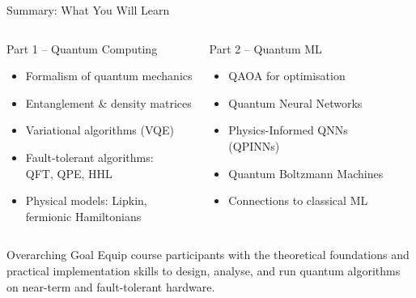 \documentclass[aspectratio=169,12pt]{beamer}
\begin{document}
\begin{frame}{Summary: What You Will Learn}
  \begin{columns}[T]
      \begin{block}{Part 1 -- Quantum Computing}
        \begin{itemize}
          \item Formalism of quantum mechanics
          \item Entanglement \& density matrices
          \item Variational algorithms (VQE)
          \item Fault-tolerant algorithms:\\
                QFT, QPE, HHL
          \item Physical models: Lipkin,\\
                fermionic Hamiltonians
        \end{itemize}
      \end{block}
      \begin{block}{Part 2 -- Quantum ML}
        \begin{itemize}
          \item QAOA for optimisation
          \item Quantum Neural Networks
          \item Physics-Informed QNNs\\
                (QPINNs)
          \item Quantum Boltzmann Machines
          \item Connections to classical ML
        \end{itemize}
      \end{block}
  \end{columns}
  \vspace{8pt}
  \begin{alertblock}{Overarching Goal}
    Equip course participants with the theoretical foundations
    and practical implementation skills to design, analyse, and run
    quantum algorithms on near-term and fault-tolerant hardware.
  \end{alertblock}
\end{frame}
\end{document}
